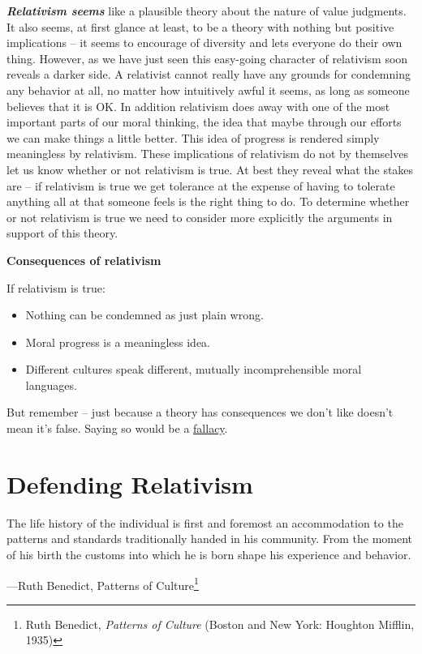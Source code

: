 \documentclass[
  12pt, openany]{book}
\makeatletter
\providecommand{\tightlist}{%
  \setlength{\itemsep}{0pt}\setlength{\parskip}{0pt}}
\newenvironment{kframe}{%
\medskip{}
\setlength{\fboxsep}{.8em}
 \def\at@end@of@kframe{}%
 \ifinner\ifhmode%
  \def\at@end@of@kframe{\end{minipage}}%
  \begin{minipage}{\columnwidth}%
 \fi\fi%
 \def\FrameCommand##1{\hskip\@totalleftmargin \hskip-\fboxsep
 \colorbox{shadecolor}{##1}\hskip-\fboxsep
     \hskip-\linewidth \hskip-\@totalleftmargin \hskip\columnwidth}%
 \MakeFramed {\advance\hsize-\width
   \@totalleftmargin\z@ \linewidth\hsize
   \@setminipage}}%
 {\par\unskip\endMakeFramed%
 \at@end@of@kframe}
\newenvironment{rmdblock}[1]
  {
  \begin{itemize}
  \renewcommand{\labelitemi}{
    \raisebox{-.7\height}[0pt][0pt]{
      {\setkeys{Gin}{width=3em,keepaspectratio}\texttt{[image: img/\#1]}}
    }
  }
  \setlength{\fboxsep}{1em}
  \begin{kframe}
  \item
  }
  {
  \end{kframe}
  \end{itemize}
  }
\newenvironment{caution}
  {\begin{rmdblock}{caution}}
  {\end{rmdblock}}
\newenvironment{epigraph}%
{
\begin{flushright}
\begin{minipage}{30em}
\begin{flushright}
\itshape
}%
{
\end{flushright}
\end{minipage}
\end{flushright}
\vspace{1em}
}
\theoremstyle{definition}
\theoremstyle{definition}
\theoremstyle{definition}
\theoremstyle{definition}
\theoremstyle{remark}
\makeatother
\begin{document}
\textbf{\emph{Relativism seems}} like a plausible theory about the nature of value judgments. It also seems, at first glance at least, to be a theory with nothing but positive implications -- it seems to encourage of diversity and lets everyone do their own thing. However, as we have just seen this easy-going character of relativism soon reveals a darker side. A relativist cannot really have any grounds for condemning any behavior at all, no matter how intuitively awful it seems, as long as someone believes that it is OK. In addition relativism does away with one of the most important parts of our moral thinking, the idea that maybe through our efforts we can make things a little better. This idea of progress is rendered simply meaningless by relativism. These implications of relativism do not by themselves let us know whether or not relativism is true. At best they reveal what the stakes are -- if relativism is true we get tolerance at the expense of having to tolerate anything all at that someone feels is the right thing to do. To determine whether or not relativism is true we need to consider more explicitly the arguments in support of this theory.

\begin{caution}
\textbf{Consequences of relativism}

If relativism is true:

\begin{itemize}
\tightlist
\item
  Nothing can be condemned as just plain wrong.
\item
  Moral progress is a meaningless idea.
\item
  Different cultures speak different, mutually incomprehensible moral languages.
\end{itemize}

But remember -- just because a theory has consequences we don't like doesn't mean it's false. Saying so would be a \protect\hyperlink{appeal-to-consequences}{fallacy}.

\end{caution}

\hypertarget{defending-relativism}{%
\section{Defending Relativism}\label{defending-relativism}}

\begin{epigraph}
The life history of the individual is first and foremost an accommodation to the patterns and standards traditionally handed in his community. From the moment of his birth the customs into which he is born shape his experience and behavior.

---Ruth Benedict, Patterns of Culture\footnote{Ruth Benedict, \emph{Patterns of Culture} (Boston and New York: Houghton Mifflin, 1935)}

\end{epigraph}
\end{document}
